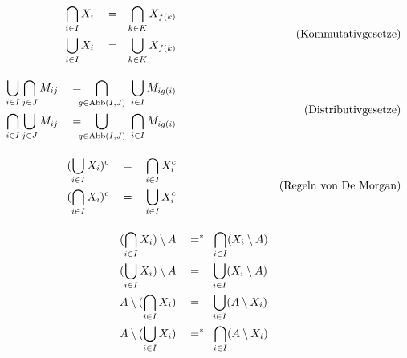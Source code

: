 \begin{align*}
    \begin{split}
        \bigcap_{i\in I} X_i & \quad =\quad \smashoperator[l]{\bigcap_{k\in K}} X_{f(k)} \\
        \bigcup_{i\in I} X_i & \quad =\quad \smashoperator[l]{\bigcup_{k\in K}} X_{f(k)}
    \end{split} && (\text{Kommutativgesetze}) \\[1em]
    \begin{split}
        \bigcup_{i \in I} \bigcap_{j \in J} M_{ij} & \quad =\quad \smashoperator[l]{\bigcap_{g \in \Abb(I,J)}}\ \bigcup_{i \in I} M_{ig(i)} \\ %
        \bigcap_{i \in I} \bigcup_{j \in J} M_{ij} & \quad =\quad \smashoperator[l]{\bigcup_{g \in \Abb(I,J)}}\ \bigcap_{i \in I} M_{ig(i)} %
    \end{split} && (\text{Distributivgesetze}) \\[1em]
    \begin{split}
    (\bigcup_{i\in I} X_i)^c & \quad =\quad \smashoperator[l]{\bigcap_{i\in I}} X_i^c \\
    (\bigcap_{i\in I} X_i)^c & \quad =\quad \smashoperator[l]{\bigcup_{i\in I}} X_i^c
    \end{split} && (\text{Regeln von De Morgan}) \\[1em]
    (\bigcap_{i\in I} X_i) \setminus A & \quad =^* \quad\hspace{-.4em} \smashoperator[l]{\bigcap_{i\in I}} (X_i \setminus A)  \\
    (\bigcup_{i\in I} X_i) \setminus A & \quad =\quad \smashoperator[l]{\bigcup_{i\in I}} (X_i \setminus A) \\
    A \setminus (\bigcap_{i\in I} X_i) & \quad =\quad \smashoperator[l]{\bigcup_{i\in I}} (A \setminus X_i) \\
    A \setminus (\bigcup_{i\in I} X_i) & \quad =^* \quad\hspace{-.4em} \smashoperator[l]{\bigcap_{i\in I}} (A \setminus X_i)
\end{align*}





